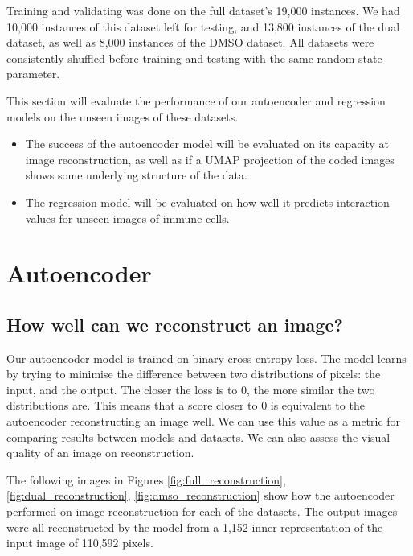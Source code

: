 Training and validating was done on the full dataset's 19,000 instances. We had 10,000 instances of this dataset left for testing, and 13,800 instances of the dual dataset, as well as 8,000 instances of the DMSO dataset. All datasets were consistently shuffled before training and testing with the same random state parameter.

This section will evaluate the performance of our autoencoder and regression models on the unseen images of these datasets.

\begin{itemize}
    \item The success of the autoencoder model will be evaluated on its capacity at image reconstruction, as well as if a UMAP projection of the coded images shows some underlying structure of the data.
    \item The regression model will be evaluated on how well it predicts interaction values for unseen images of immune cells.
\end{itemize}

\section{Autoencoder}

\subsection{How well can we reconstruct an image?}

Our autoencoder model is trained on binary cross-entropy loss. The model learns by trying to minimise the difference between two distributions of pixels: the input, and the output. The closer the loss is to 0, the more similar the two distributions are. This means that a score closer to 0 is equivalent to the autoencoder reconstructing an image well. We can use this value as a metric for comparing results between models and datasets. We can also assess the visual quality of an image on reconstruction.

The following images in Figures \ref{fig:full_reconstruction}, \ref{fig:dual_reconstruction}, \ref{fig:dmso_reconstruction} show how the autoencoder performed on image reconstruction for each of the datasets. The output images were all reconstructed by the model from a 1,152 inner representation of the input image of 110,592 pixels.

